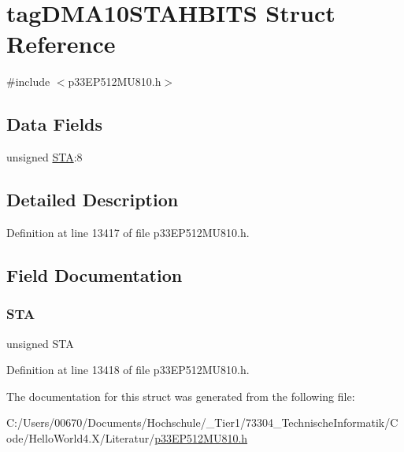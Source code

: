 \hypertarget{structtag_d_m_a10_s_t_a_h_b_i_t_s}{}\section{tag\+D\+M\+A10\+S\+T\+A\+H\+B\+I\+TS Struct Reference}
\label{structtag_d_m_a10_s_t_a_h_b_i_t_s}


{\ttfamily \#include $<$p33\+E\+P512\+M\+U810.\+h$>$}

\subsection*{Data Fields}
\begin{DoxyCompactItemize}
\item 
unsigned \hyperlink{structtag_d_m_a10_s_t_a_h_b_i_t_s_a0eec78ddd2c12af678d5fab70fe62d14}{S\+TA}\+:8
\end{DoxyCompactItemize}


\subsection{Detailed Description}


Definition at line 13417 of file p33\+E\+P512\+M\+U810.\+h.



\subsection{Field Documentation}
\mbox{\label{structtag_d_m_a10_s_t_a_h_b_i_t_s_a0eec78ddd2c12af678d5fab70fe62d14}} 
\subsubsection{\texorpdfstring{S\+TA}{STA}}
{\footnotesize\ttfamily unsigned S\+TA}



Definition at line 13418 of file p33\+E\+P512\+M\+U810.\+h.



The documentation for this struct was generated from the following file\+:\begin{DoxyCompactItemize}
\item 
C\+:/\+Users/00670/\+Documents/\+Hochschule/\+\_\+\+Tier1/73304\+\_\+\+Technische\+Informatik/\+Code/\+Hello\+World4.\+X/\+Literatur/\hyperlink{p33_e_p512_m_u810_8h}{p33\+E\+P512\+M\+U810.\+h}\end{DoxyCompactItemize}
